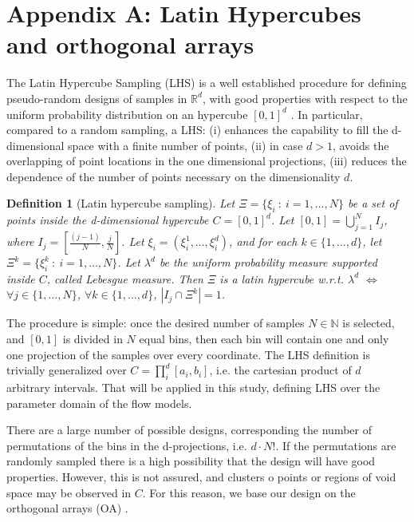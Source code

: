 \documentclass{article}
\newtheorem{definition}[theorem]{Definition}
\begin{document}
\section*{Appendix A: Latin Hypercubes and orthogonal arrays}
The Latin Hypercube Sampling (LHS) is a well established procedure for defining pseudo-random designs of samples in $\mathbb R^d$, with good properties with respect to the uniform probability distribution on an hypercube $[0,1]^d$ \citep{McKay1979,Owen1992b,Stein1987,Ranjan2014,Mingyao2016}. In particular, compared to a random sampling, a LHS: (i) enhances the capability to fill the d-dimensional space with a finite number of points, (ii) in case $d>1$, avoids the overlapping of point locations in the one dimensional projections, (iii) reduces the dependence of the number of points necessary on the dimensionality $d$.

\begin{definition}[Latin hypercube sampling]
Let $\Xi=\{\xi_i\ :\ i=1,\dots,N\}$ be a set of points inside the d-dimensional hypercube $C=[0,1]^d$. Let $[0,1]=\bigcup_{j=1}^{N} I_j$, where $I_j=[\frac{(j-1)}{N},\frac{j}{N}]$. Let $\xi_i=\left(\xi_i^1,\dots,\xi_i^d\right)$, and for each $k\in\{1,\dots,d\}$, let $\Xi^k=\{\xi^k_i\ :\ i=1,\dots,N\}$. Let $\lambda^d$ be the uniform probability measure supported inside $C$, called Lebesgue measure. Then $\Xi$ is a latin hypercube w.r.t. $\lambda^d$ $\Longleftrightarrow$ $\forall j\in \{1,\dots,N\}$, $\forall k\in\{1,\dots,d\}$, $\left|I_j\cap\Xi^k\right|=1$.
\end{definition}

The procedure is simple: once the desired number of samples $N\in\mathbb N$ is selected, and $[0,1]$ is divided in $N$ equal bins, then each bin will contain one and only one projection of the samples over every coordinate. The LHS definition is trivially generalized over $C=\prod^d_i [a_i, b_i]$, i.e. the cartesian product of $d$ arbitrary intervals. That will be applied in this study, defining LHS over the parameter domain of the flow models.

There are a large number of possible designs, corresponding the number of permutations of the bins in the d-projections, i.e. $d\cdot N!$. If the permutations are randomly sampled there is a high possibility that the design will have good properties. However, this is not assured, and clusters o points or regions of void space may be observed in $C$. For this reason, we base our design on the orthogonal arrays (OA) \citep{Owen1992a,Tang1993}.
\end{document}
